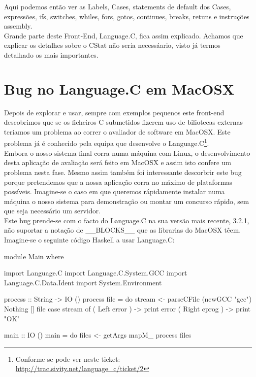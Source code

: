 Aqui podemos então ver as Labels, Cases, statements de default dos Cases, expressões, ifs, switches,
whiles, fors, gotos, continues, breaks, retuns e instruções assembly.\\

Grande parte deste Front-End, Language.C, fica assim explicado. Achamos que explicar os detalhes
sobre o \textrm{CStat} não seria necessáario, visto já termos detalhado os mais importantes.

\section{Bug no \textrm{Language.C} em \textrm{MacOSX}}
Depois de explorar e usar, sempre com exemplos pequenos este front-end descobrimos que se os ficheiros C submetidos fizerem uso de biliotecas externas teriamos um
problema ao correr o avaliador de software em MacOSX. Este problema já é conhecido pela equipa que desenvolve o Language.C\footnote{Conforme se pode ver neste ticket: \url{http://trac.sivity.net/language_c/ticket/2}}.\\
Embora o nosso sistema final corra numa máquina com Linux, o desenvolvimento desta aplicação de avaliação será feito em MacOSX e assim isto confere um problema nesta fase.
Mesmo assim também foi interessante descorbrir este bug porque pretendemos que a nossa aplicação corra no máximo de plataformas possíveis. Imagine-se o caso em que
queremos rápidamente instalar numa máquina o nosso sistema para demonstração ou montar um concurso rápido, sem que seja necessário um servidor.\\

Este bug prende-se com o facto do Language.C na sua versão mais recente, 3.2.1, não suportar a notação de \_\_BLOCKS\_\_ que as librarias do MacOSX têem.\\
Imagine-se o seguinte código Haskell a usar Language.C:

\begin{haskell}
module Main where

import Language.C
import Language.C.System.GCC
import Language.C.Data.Ident
import System.Environment

process :: String -> IO ()
process file = do
    stream <- parseCFile (newGCC "gcc") Nothing [] file
    case stream of
        ( Left error  ) -> print error
        ( Right cprog ) -> print "OK"

main :: IO ()
main = do
    files <- getArgs
    mapM_ process files
\end{haskell}

